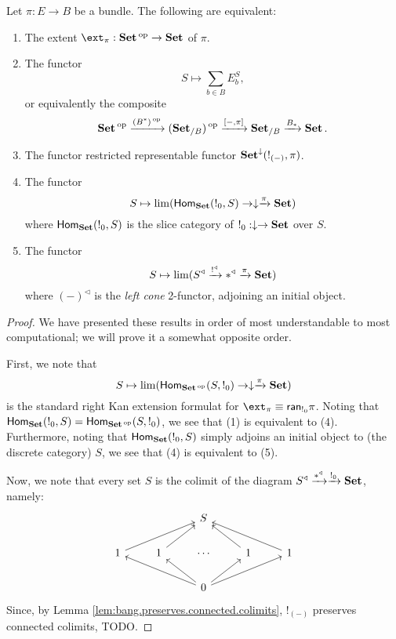 \begin{prop}\label{prop:set.characterizing.extent}
  Let $\pi : E \to B$ be a bundle. The following are equivalent:
  \begin{enumerate}
  \item The extent $\ext_{\pi} : \Set\op \to \Set$ of $\pi$.
  \item The functor
    $$S \mapsto \sum_{b \in B} E_b^S,$$
    or equivalently the composite
  $$\operatorname{\textbf{Set}}\operatorname{^\text{op}} \xrightarrow{(B^{\ast})\operatorname{^\text{op}}} (\operatorname{\textbf{Set}}_{/B})\operatorname{^\text{op}} \xrightarrow{[-, \pi]} \operatorname{\textbf{Set}}_{/B}
  \xrightarrow{B_{\ast}} \operatorname{\textbf{Set}}.$$
\item The functor restricted representable functor
  $\operatorname{\textbf{Set}}^{\downarrow}(!_{(-)}, \pi)$.
\item The functor
  $$S \mapsto \lim(\operatorname{\mathsf{Hom}}_{\operatorname{\textbf{Set}}}(!_0, S) \to \downarrow \xrightarrow{\pi} \operatorname{\textbf{Set}})$$
  where $\operatorname{\mathsf{Hom}}_{\operatorname{\textbf{Set}}}(!_0, S)$ is the slice category of $!_0 : \downarrow \to
  \operatorname{\textbf{Set}}$ over $S$.
\item The functor
  $$S \mapsto \lim(S^{\triangleleft} \xrightarrow{!^{\triangleleft}} \ast^{\triangleleft}
  \xrightarrow{\pi} \operatorname{\textbf{Set}})$$
  where $(-)^{\triangleleft}$ is the \emph{left cone} 2-functor, adjoining an initial object.
  \end{enumerate}
\end{prop}
\begin{proof}
We have presented these results in order of most understandable to most
computational; we will prove it a somewhat opposite order.

First, we note that 
$$S \mapsto \lim(\operatorname{\mathsf{Hom}}_{\operatorname{\textbf{Set}}\operatorname{^\text{op}}}(S, !_0) \to \downarrow \xrightarrow{\pi} \operatorname{\textbf{Set}})$$
is the standard right Kan extension formulat for $\ext_{\pi} \equiv
\term{ran}_{!_0} \pi$. Noting that $\operatorname{\mathsf{Hom}}_{\operatorname{\textbf{Set}}}(!_0, S) = \operatorname{\mathsf{Hom}}_{\operatorname{\textbf{Set}}\operatorname{^\text{op}}}(S,
!_0)$, we see that (1) is equivalent to (4). Furthermore, noting that
$\operatorname{\mathsf{Hom}}_{\operatorname{\textbf{Set}}}(!_0, S)$ simply adjoins an initial object to (the discrete
category) $S$, we see that (4) is equivalent to (5).

Now, we note that every set $S$ is the colimit of the diagram $S^{\triangleleft}
\xrightarrow{\ast^{\triangleleft}} \xrightarrow{!_0} \operatorname{\textbf{Set}}$, namely:
\[
\begin{tikzcd}
              &              & S                                               &              &               \\
1 \arrow[rru] & 1 \arrow[ru] & \cdots                                          & 1 \arrow[lu] & 1 \arrow[llu] \\
              &              & 0 \arrow[llu] \arrow[lu] \arrow[ru] \arrow[rru] &              &              
\end{tikzcd}
\]
Since, by Lemma \ref{lem:bang.preserves.connected.colimits}, $!_{(-)}$
preserves connected colimits, {\color{red} TODO}.
\end{proof}

